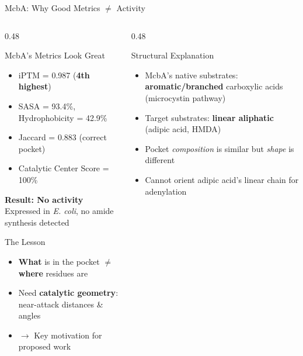 \documentclass[aspectratio=169, 11pt]{beamer}
\begin{document}
\begin{frame}{McbA: Why Good Metrics $\neq$ Activity}
\vspace{-6pt}

\begin{columns}[T]
\begin{column}{0.48\textwidth}
\begin{block}{McbA's Metrics Look Great}
\begin{itemize}\scriptsize
\item iPTM = 0.987 (\textbf{4th highest})
\item SASA = 93.4\%, Hydrophobicity = 42.9\%
\item Jaccard = 0.883 (correct pocket)
\item Catalytic Center Score = 100\%
\end{itemize}
\end{block}

\colorbox{accentred!20}{\parbox{0.92\textwidth}{\centering
\normalsize\textbf{Result: No activity}\\[1pt]
\scriptsize Expressed in \textit{E. coli}, no amide synthesis detected
}}

\vspace{4pt}
\begin{exampleblock}{The Lesson}
\begin{itemize}\scriptsize
\item \textbf{What} is in the pocket $\neq$ \textbf{where} residues are
\item Need \textbf{catalytic geometry}: near-attack distances \& angles
\item $\rightarrow$ Key motivation for proposed work
\end{itemize}
\end{exampleblock}
\end{column}

\begin{column}{0.48\textwidth}
\begin{alertblock}{Structural Explanation}
\begin{itemize}\scriptsize
\item McbA's native substrates: \textbf{aromatic/branched} carboxylic acids (microcystin pathway)
\item Target substrates: \textbf{linear aliphatic} (adipic acid, HMDA)
\item Pocket \textit{composition} is similar but \textit{shape} is different
\item Cannot orient adipic acid's linear chain for adenylation
\end{itemize}
\end{alertblock}


\end{column}
\end{columns}
\end{frame}
\end{document}
